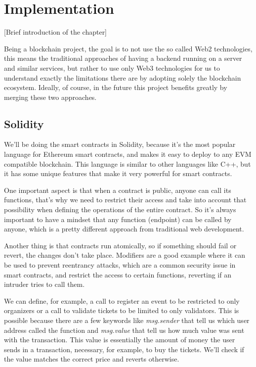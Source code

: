 \chapter{Implementation}
\label{ch:implementation}

[Brief introduction of the chapter]

Being a blockchain project, the goal is to not use the so called Web2
technologies, this means the traditional approaches of having a backend running
on a server and similar services, but rather to use only Web3 technologies for
us to understand exactly the limitations there are by adopting solely the
blockchain ecosystem. Ideally, of course, in the future this project benefits
greatly by merging these two approaches.

\section{Solidity}
\label{sec:solidity}

We'll be doing the smart contracts in Solidity, because it's the most popular
language for Ethereum smart contracts, and makes it easy to deploy to any EVM
compatible blockchain. This language is similar to other languages like C++,
but it has some unique features that make it very powerful for smart contracts.

One important aspect is that when a contract is public, anyone can call its
functions, that's why we need to restrict their access and take into account
that possibility when defining the operations of the entire contract. So it's
always important to have a mindset that any function (endpoint) can be called
by anyone, which is a pretty different approach from traditional web
development.

Another thing is that contracts run atomically, so if something should fail or
revert, the changes don't take place. Modifiers are a good example where it can
be used to prevent reentrancy attacks, which are a common security issue in
smart contracts, and restrict the access to certain functions, reverting if an
intruder tries to call them.

We can define, for example, a call to register an event to be restricted to
only organizers or a call to validate tickets to be limited to only validators.
This is possible because there are a few keywords like \textit{msg.sender} that
tell us which user address called the function and \textit{msg.value} that tell
us how much value was sent with the transaction. This value is essentially the
amount of money the user sends in a transaction, necessary, for example, to buy
the tickets. We'll check if the value matches the correct price and reverts
otherwise.

